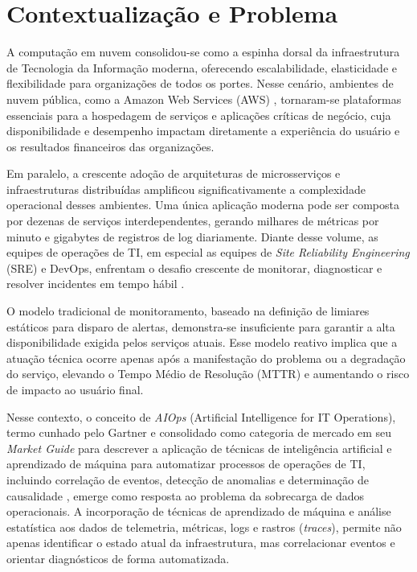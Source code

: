 \section{Contextualização e Problema}
A computação em nuvem consolidou-se como a espinha dorsal da infraestrutura de Tecnologia da Informação moderna, oferecendo escalabilidade, elasticidade e flexibilidade para organizações de todos os portes. Nesse cenário, ambientes de nuvem pública, como a Amazon Web Services (AWS) \cite{aws2025cloud}, tornaram-se plataformas essenciais para a hospedagem de serviços e aplicações críticas de negócio, cuja disponibilidade e desempenho impactam diretamente a experiência do usuário e os resultados financeiros das organizações.

Em paralelo, a crescente adoção de arquiteturas de microsserviços e infraestruturas distribuídas amplificou significativamente a complexidade operacional desses ambientes. Uma única aplicação moderna pode ser composta por dezenas de serviços interdependentes, gerando milhares de métricas por minuto e gigabytes de registros de log diariamente. Diante desse volume, as equipes de operações de TI, em especial as equipes de \emph{Site Reliability Engineering} (SRE) e DevOps, enfrentam o desafio crescente de monitorar, diagnosticar e resolver incidentes em tempo hábil \cite{ibm2025aiops}.

O modelo tradicional de monitoramento, baseado na definição de limiares estáticos para disparo de alertas, demonstra-se insuficiente para garantir a alta disponibilidade exigida pelos serviços atuais. Esse modelo reativo implica que a atuação técnica ocorre apenas após a manifestação do problema ou a degradação do serviço, elevando o Tempo Médio de Resolução (MTTR) e aumentando o risco de impacto ao usuário final.

Nesse contexto, o conceito de \emph{AIOps} (Artificial Intelligence for IT Operations), termo cunhado pelo Gartner e consolidado como categoria de mercado em seu \emph{Market Guide} \cite{prasad2018market} para descrever a aplicação de técnicas de inteligência artificial e aprendizado de máquina para automatizar processos de operações de TI, incluindo correlação de eventos, detecção de anomalias e determinação de causalidade \cite{notaro2021survey}, emerge como resposta ao problema da sobrecarga de dados operacionais. A incorporação de técnicas de aprendizado de máquina e análise estatística aos dados de telemetria, métricas, logs e rastros (\emph{traces}), permite não apenas identificar o estado atual da infraestrutura, mas correlacionar eventos e orientar diagnósticos de forma automatizada.

